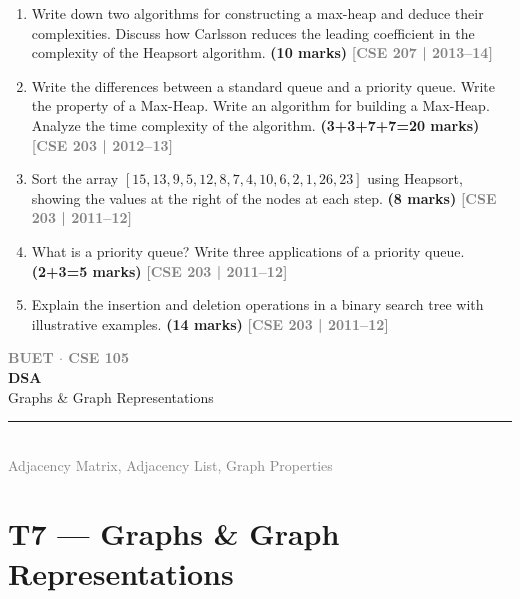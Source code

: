 \documentclass[12pt,a3paper]{article}
\newcommand{\yr}[1]{\hfill\textcolor{gray}{\small\textbf{[#1]}}}
\newcommand{\mk}[1]{\textcolor{orange!70!black}{\small\textbf{(#1 marks)}}}
\newcommand{\secdivider}[4]{%
  \newpage\thispagestyle{empty}%
  \vspace*{\fill}%
  \begin{tcolorbox}[enhanced,colback=#4!7,colframe=#3,boxrule=1.5pt,arc=8pt,
    left=20pt,right=20pt,top=22pt,bottom=22pt,
    shadow={3pt}{-3pt}{0pt}{black!15}]
    \centering
    {\large\textcolor{gray}{\textbf{BUET $\cdot$ CSE 105}}}\\[8pt]
    {\fontsize{26}{32}\selectfont\bfseries\textcolor{#3}{DSA}}\\[6pt]
    {\fontsize{15}{19}\selectfont\textcolor{dgray}{#1}}\\[12pt]
    \textcolor{#3!60}{\rule{0.5\textwidth}{0.5pt}}\\[6pt]
    {\small\textcolor{gray}{#2}}
  \end{tcolorbox}%
  \vspace*{\fill}\newpage%
}
\begin{document}
\begin{enumerate}
\item Write down two algorithms for constructing a max-heap and deduce their complexities. Discuss how Carlsson reduces the leading coefficient in the complexity of the Heapsort algorithm. \mk{10}
\yr{CSE 207 | 2013--14}

\item Write the differences between a standard queue and a priority queue. Write the property of a Max-Heap. Write an algorithm for building a Max-Heap. Analyze the time complexity of the algorithm. \mk{3+3+7+7=20}
\yr{CSE 203 | 2012--13}

\item Sort the array $[15, 13, 9, 5, 12, 8, 7, 4, 10, 6, 2, 1, 26, 23]$ using Heapsort, showing the values at the right of the nodes at each step. \mk{8}
\yr{CSE 203 | 2011--12}

\item What is a priority queue? Write three applications of a priority queue. \mk{2+3=5}
\yr{CSE 203 | 2011--12}


\item Explain the insertion and deletion operations in a binary search tree with illustrative examples. \mk{14}
\yr{CSE 203 | 2011--12}

\end{enumerate}
\newpage

\secdivider{Graphs \& Graph Representations}{Adjacency Matrix, Adjacency List, Graph Properties}{cG}{cG}
\label{sec:T7}
\section{T7 --- Graphs \& Graph Representations}
\end{document}
